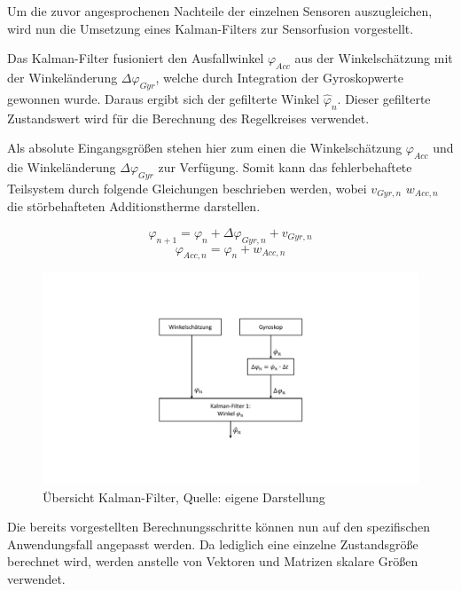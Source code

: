 Um die zuvor angesprochenen Nachteile der einzelnen Sensoren auszugleichen, wird nun die Umsetzung eines Kalman-Filters zur Sensorfusion vorgestellt.

Das Kalman-Filter fusioniert den Ausfallwinkel $\varphi_{Acc}$ aus der Winkelschätzung mit der Winkeländerung $\Delta \varphi_{Gyr}$, welche durch Integration der Gyroskopwerte gewonnen wurde. Daraus ergibt sich der gefilterte Winkel $\hat{\varphi}_n$. Dieser gefilterte Zustandswert wird für die Berechnung des Regelkreises verwendet.

Als absolute Eingangsgrößen stehen hier zum einen die Winkelschätzung $\varphi_{Acc}$ und die Winkeländerung $\Delta \varphi_{Gyr}$ zur Verfügung. Somit kann das fehlerbehaftete Teilsystem durch folgende Gleichungen beschrieben werden, wobei $v_{Gyr,n}$ $w_{Acc,n}$ die störbehafteten Additionstherme darstellen.

\begin{equation}
\varphi_{n+1} = \varphi_{n} + \Delta \varphi_{Gyr,n} + v_{Gyr,n}
\end{equation}
\begin{equation}
\varphi_{Acc,n} = \varphi_n + w_{Acc,n}
\end{equation}

\begin{figure}[!h]
\centering
\includegraphics[width=0.8\linewidth, trim={0 3.5cm 0 3.5cm},clip]{img/kalman_phi_overview}
\caption{Übersicht Kalman-Filter, Quelle: eigene Darstellung}
\end{figure}

Die bereits vorgestellten Berechnungsschritte können nun auf den spezifischen Anwendungsfall angepasst werden. Da lediglich eine einzelne Zustandsgröße berechnet wird, werden anstelle von Vektoren und Matrizen skalare Größen verwendet.

